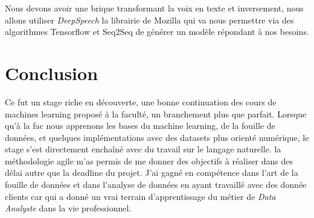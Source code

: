 Nous devons avoir une brique transformant la voix en texte et inversement, nous allons utiliser \textit{DeepSpeech} la librairie de Mozilla qui va nous permettre via des algorithmes Tensorflow et Seq2Seq de générer un modèle répondant à nos besoins.\linebreak

\chapter{Conclusion}

Ce fut un stage riche en découverte, une bonne continuation des cours de machines learning proposé à la faculté, un branchement plus que parfait. Lorsque qu'à la fac nous apprenons les bases du machine learning, de la fouille de données, et quelques implémentations avec des datasets plus orienté numérique, le stage s'est directement enchaîné avec du travail sur le langage naturelle.\linebreak
la méthodologie agile m'as permis de me donner des objectifs à réaliser dans des délai autre que la deadline du projet.\linebreak
J'ai gagné en compétence dans l'art de la fouille de données et dans l'analyse de données en ayant travaillé avec des donnée clients car qui a donné un vrai terrain d'apprentissage du métier de \textit{Data Analyste} dans la vie professionnel.
